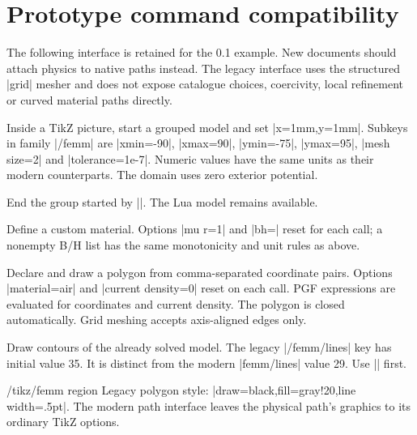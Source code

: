 \section{Prototype command compatibility}
The following interface is retained for the 0.1 example. New documents
should attach physics to native paths instead. The legacy interface
uses the structured |grid| mesher and does not expose catalogue choices,
coercivity, local refinement or curved material paths directly.

\begin{command}{\femmbegin{}}
Inside a TikZ picture, start a grouped model and set |x=1mm,y=1mm|.
Subkeys in family |/femm| are |xmin=-90|, |xmax=90|, |ymin=-75|,
|ymax=95|, |mesh size=2| and |tolerance=1e-7|. Numeric values have the same
units as their modern counterparts. The domain uses zero exterior potential.
\end{command}
\begin{command}{\femmend}
End the group started by |\femmbegin|. The Lua model remains available.
\end{command}
\begin{command}{\femmmaterial{}}
Define a custom material. Options |mu r=1| and |bh={}| reset for each call;
a nonempty B/H list has the same monotonicity and unit rules as above.
\end{command}
\begin{command}{\femmregion{}}
Declare and draw a polygon from comma-separated coordinate pairs.
Options |material=air| and |current density=0| reset on each call.
PGF expressions are evaluated for coordinates and current density. The
polygon is closed automatically. Grid meshing accepts axis-aligned edges only.
\end{command}
\begin{command}{\femmfieldlines{}}
Draw contours of the already solved model. The legacy |/femm/lines| key
has initial value 35. It is distinct from the modern |femm/lines| value 29.
Use |\femmsolve| first.
\end{command}
\begin{stylekey}{/tikz/femm region}
Legacy polygon style: |draw=black,fill=gray!20,line width=.5pt|.
The modern path interface leaves the physical path's graphics to its
ordinary TikZ options.
\end{stylekey}

